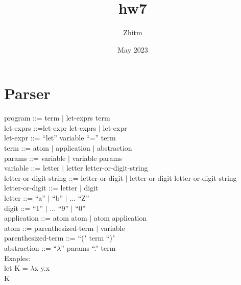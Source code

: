 \documentclass{article}
\title{hw7}
\author{Zhitm}
\date{May 2023}
\begin{document}
\maketitle

\section{Parser}


program ::= term $\vert$ let-exprs term\\
let-exprs ::=let-expr let-exprs $\vert$ let-expr\\
let-expr ::= ``let'' variable ``='' term\\
term ::= atom $\vert$ application $\vert$ abstraction \\
params ::= variable $\vert$ variable params\\
variable ::= letter $\vert$ letter letter-or-digit-string\\
letter-or-digit-string ::= letter-or-digit $\vert$ letter-or-digit letter-or-digit-string\\
letter-or-digit ::= letter $\vert$ digit\\letter ::= ``a'' $\vert$ ``b'' $\vert$ ... ``Z''\\
digit ::= ``1'' $\vert$ ... ``9'' $\vert$ ``0''\\
application ::= atom atom $\vert$ atom application\\
atom ::= parenthesized-term $\vert$ variable\\
parenthesized-term ::= ``(" term ``)"\\
abstraction ::= ``$\lambda$'' params ``.'' term\\





Exaples:\\
let K = $\lambda$x y.x\\
K\\
\end{document}
